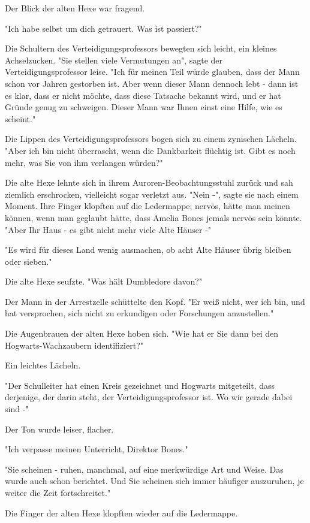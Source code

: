 {Der Blick der alten Hexe war fragend.

"Ich habe selbst um dich getrauert. Was ist passiert?"

Die Schultern des Verteidigungsprofessors bewegten sich leicht, ein kleines Achselzucken. "Sie stellen viele Vermutungen an", sagte der Verteidigungsprofessor leise. "Ich für meinen Teil würde glauben, dass der Mann schon vor Jahren gestorben ist. Aber wenn dieser Mann dennoch lebt - dann ist es klar, dass er nicht möchte, dass diese Tatsache bekannt wird, und er hat Gründe genug zu schweigen. Dieser Mann war Ihnen einst eine Hilfe, wie es scheint."

Die Lippen des Verteidigungsprofessors bogen sich zu einem zynischen Lächeln. "Aber ich bin nicht überrascht, wenn die Dankbarkeit flüchtig ist. Gibt es noch mehr, was Sie von ihm verlangen würden?"

Die alte Hexe lehnte sich in ihrem Auroren-Beobachtungsstuhl zurück und sah ziemlich erschrocken, vielleicht sogar verletzt aus. "Nein -", sagte sie nach einem Moment. Ihre Finger klopften auf die Ledermappe; nervös, hätte man meinen können, wenn man geglaubt hätte, dass Amelia Bones jemals nervös sein könnte. "Aber Ihr Haus - es gibt nicht mehr viele Alte Häuser -"

"Es wird für dieses Land wenig ausmachen, ob acht Alte Häuser übrig bleiben oder sieben."

Die alte Hexe seufzte. "Was hält Dumbledore davon?"

Der Mann in der Arrestzelle schüttelte den Kopf. "Er weiß nicht, wer ich bin, und hat versprochen, sich nicht zu erkundigen oder Forschungen anzustellen."

Die Augenbrauen der alten Hexe hoben sich. "Wie hat er Sie dann bei den Hogwarts-Wachzaubern identifiziert?"

Ein leichtes Lächeln.

"Der Schulleiter hat einen Kreis gezeichnet und Hogwarts mitgeteilt, dass derjenige, der darin steht, der Verteidigungsprofessor ist. Wo wir gerade dabei sind -"

Der Ton wurde leiser, flacher.

"Ich verpasse meinen Unterricht, Direktor Bones."

"Sie scheinen - ruhen, manchmal, auf eine merkwürdige Art und Weise. Das wurde auch schon berichtet. Und Sie scheinen sich immer häufiger auszuruhen, je weiter die Zeit fortschreitet."

Die Finger der alten Hexe klopften wieder auf die Ledermappe.

}
